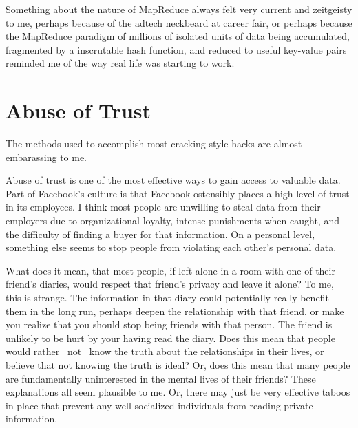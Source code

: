 \documentclass[12pt]{article}
\begin{document}
Something about the nature of MapReduce always felt very current and
zeitgeisty to me, perhaps because of the adtech neckbeard at career
fair, or perhaps because the MapReduce paradigm of millions of isolated
units of data being accumulated, fragmented by a inscrutable hash
function, and reduced to useful key-value pairs reminded me of the way
real life was starting to work.

\section{Abuse of Trust}
The methods used to accomplish most cracking-style hacks are almost
embarassing to me. 

Abuse of trust is one of the most effective ways to gain access to valuable
data.  Part of Facebook's culture is that Facebook ostensibly places a high
level of trust in its employees.  I think most people are unwilling to steal
data from their employers due to organizational loyalty, intense punishments
when caught, and the difficulty of finding a buyer for that information.  On a
personal level, something else seems to stop people from violating each other's
personal data.

What does it mean, that most people, if left alone in a room with one of their
friend's diaries, would respect that friend's privacy and leave it alone?  To
me, this is strange.  The information in that diary could potentially really
benefit them in the long run, perhaps deepen the relationship with that friend,
or make you realize that you should stop being friends with that person.  The
friend is unlikely to be hurt by your having read the diary.  Does this mean
that people would rather ~not~ know the truth about the relationships in their
lives, or believe that not knowing the truth is ideal?  Or, does this mean that
many people are fundamentally uninterested in the mental lives of their friends?
These explanations all seem plausible to me.  Or, there may just be very
effective taboos in place that prevent any well-socialized individuals from
reading private information.
\end{document}
